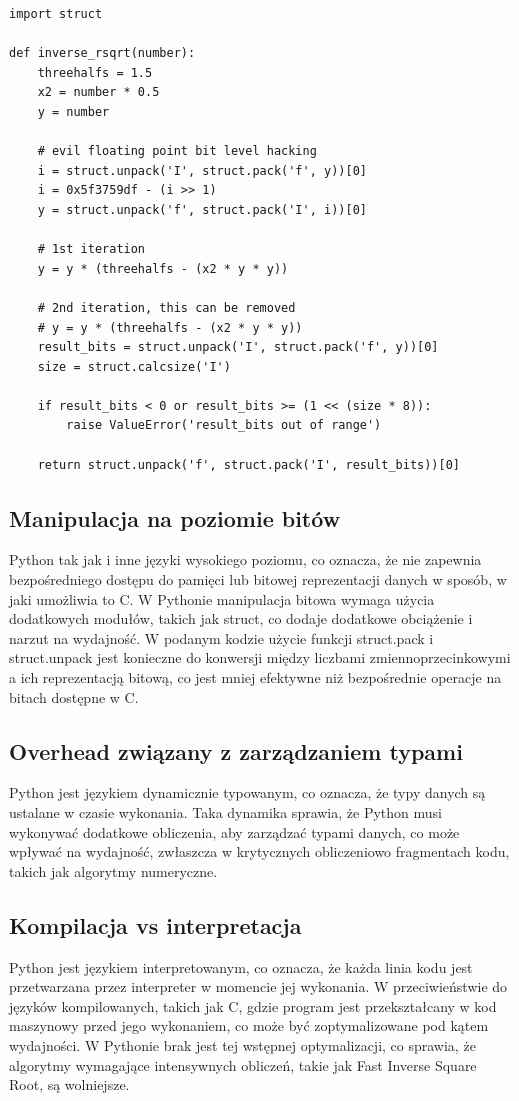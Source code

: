 \documentclass[12pt]{article}
\begin{document}
\begin{lstlisting}
import struct
 
def inverse_rsqrt(number):
    threehalfs = 1.5
    x2 = number * 0.5
    y = number
 
    # evil floating point bit level hacking
    i = struct.unpack('I', struct.pack('f', y))[0]
    i = 0x5f3759df - (i >> 1)
    y = struct.unpack('f', struct.pack('I', i))[0]
 
    # 1st iteration
    y = y * (threehalfs - (x2 * y * y))
 
    # 2nd iteration, this can be removed
    # y = y * (threehalfs - (x2 * y * y))
    result_bits = struct.unpack('I', struct.pack('f', y))[0]
    size = struct.calcsize('I')
 
    if result_bits < 0 or result_bits >= (1 << (size * 8)):
        raise ValueError('result_bits out of range')
 
    return struct.unpack('f', struct.pack('I', result_bits))[0]
\end{lstlisting}

\subsection{Manipulacja na poziomie bitów}
Python tak jak i inne języki wysokiego poziomu, co oznacza, że nie zapewnia bezpośredniego dostępu do pamięci lub bitowej reprezentacji danych w sposób, w jaki umożliwia to C. W Pythonie manipulacja bitowa wymaga użycia dodatkowych modułów, takich jak struct, co dodaje dodatkowe obciążenie i narzut na wydajność. W podanym kodzie użycie funkcji struct.pack i struct.unpack jest konieczne do konwersji między liczbami zmiennoprzecinkowymi a ich reprezentacją bitową, co jest mniej efektywne niż bezpośrednie operacje na bitach dostępne w C.

\subsection{Overhead związany z zarządzaniem typami}
Python jest językiem dynamicznie typowanym, co oznacza, że typy danych są ustalane w czasie wykonania. Taka dynamika sprawia, że Python musi wykonywać dodatkowe obliczenia, aby zarządzać typami danych, co może wpływać na wydajność, zwłaszcza w krytycznych obliczeniowo fragmentach kodu, takich jak algorytmy numeryczne.

\subsection{Kompilacja vs interpretacja}
Python jest językiem interpretowanym, co oznacza, że każda linia kodu jest przetwarzana przez interpreter w momencie jej wykonania. W przeciwieństwie do języków kompilowanych, takich jak C, gdzie program jest przekształcany w kod maszynowy przed jego wykonaniem, co może być zoptymalizowane pod kątem wydajności. W Pythonie brak jest tej wstępnej optymalizacji, co sprawia, że algorytmy wymagające intensywnych obliczeń, takie jak Fast Inverse Square Root, są wolniejsze.
\end{document}
